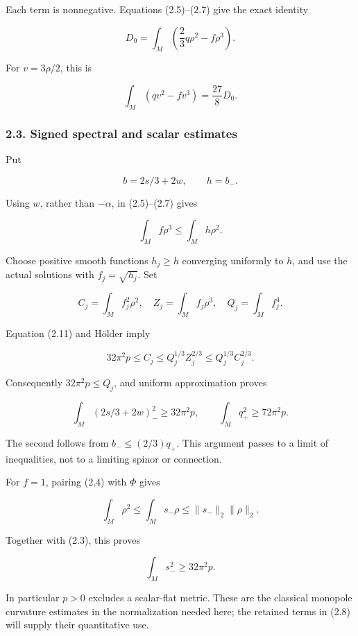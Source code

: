 \documentclass[
  10pt,
]{article}
\begin{document}
Each term is nonnegative. Equations (2.5)--(2.7) give the exact identity

\[
 D_0=\int_M\left(\frac23q\rho^2-f\rho^3\right).
 \tag{2.9}
\]

For \(v=3\rho/2\), this is

\[
                  \int_M(qv^2-fv^3)=\frac{27}{8}D_0.
 \tag{2.10}
\]

\hypertarget{signed-spectral-and-scalar-estimates}{%
\subsubsection{2.3. Signed spectral and scalar
estimates}\label{signed-spectral-and-scalar-estimates}}

Put

\[
                  b=2s/3+2w,\qquad h=b_-.
\]

Using \(w\), rather than \(-\alpha\), in (2.5)--(2.7) gives

\[
                       \int_M f\rho^3\le\int_M h\rho^2.
 \tag{2.11}
\]

Choose positive smooth functions \(h_j\ge h\) converging uniformly to
\(h\), and use the actual solutions with \(f_j=\sqrt{h_j}\). Set

\[
 C_j=\int_M f_j^2\rho^2,\quad Z_j=\int_M f_j\rho^3,
 \quad Q_j=\int_M f_j^4.
\]

Equation (2.11) and Hölder imply

\[
 32\pi^2p\le C_j\le Q_j^{1/3}Z_j^{2/3}
                            \le Q_j^{1/3}C_j^{2/3}.
\]

Consequently \(32\pi^2p\le Q_j\), and uniform approximation proves

\[
 \int_M(2s/3+2w)_-^2\ge32\pi^2p,\qquad
 \int_M q_+^2\ge72\pi^2p.                               \tag{2.12}
\]

The second follows from \(b_-\le(2/3)q_+\). This argument passes to a
limit of inequalities, not to a limiting spinor or connection.

For \(f=1\), pairing (2.4) with \(\Phi\) gives

\[
 \int_M\rho^2\le\int_Ms_-\rho
        \le\|s_-\|_2\|\rho\|_2.
\]

Together with (2.3), this proves

\[
                        \int_Ms_-^2\ge32\pi^2p.          \tag{2.13}
\]

In particular \(p>0\) excludes a scalar-flat metric. These are the
classical monopole curvature estimates in the normalization needed here;
the retained terms in (2.8) will supply their quantitative use.
\end{document}
